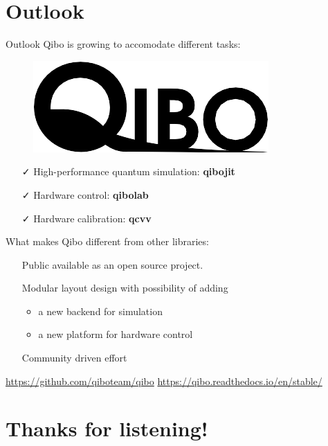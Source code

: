 \documentclass[11pt]{beamer}
\begin{document}
\section{Outlook}

\begin{frame}{Outlook}
    Qibo is growing to accomodate different tasks:
    \begin{figure}
        \includegraphics[width=0.9\linewidth]{figures/qibo_logo.png} 
        \end{figure}
    \begin{itemize}
        \item[ \color{teal} \faCheck] High-performance quantum simulation: {\color{blue} \textbf{qibojit}}
        \item[ \color{orange}\faCheck] Hardware control: {\color{red} \textbf{qibolab}}
        \item[ \color{orange} \faCheck] Hardware calibration: { \color{teal} \textbf{qcvv} }
    \end{itemize}

    What makes Qibo different from other libraries:
    \begin{itemize}
        \item[ \faPlus] Public available as an open source project.
        \item[ \faPlus] Modular layout design with possibility of adding
        \begin{itemize}
            \item a new backend for simulation
            \item a new platform for hardware control
        \end{itemize}
        \item[ \faPlus] Community driven effort
    \end{itemize}

    \url{https://github.com/qiboteam/qibo} \hfill \url{https://qibo.readthedocs.io/en/stable/}
\end{frame}
\section{Thanks for listening!}
\end{document}
